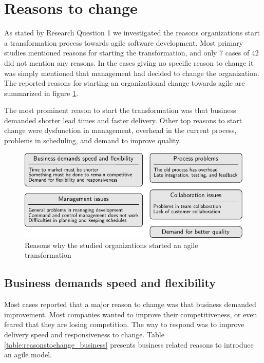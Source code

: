 \clearpage

\section{Reasons to change}

As stated by Research Question 1 we investigated the reasons organizations start
a transformation process towards agile software development. Most primary
studies mentioned reasons for starting the transformation, and only 7 cases of
42 did not mention any reasons. In the cases giving no specific reason to change
it was simply mentioned that management had decided to change the organization.
The reported reasons for starting an organizational change towards agile are
summarized in figure \ref{fig:reasonstochange_summary}.



The most prominent reason to start the transformation was that business demanded
shorter lead times and faster delivery. Other top reasons to start change were
dysfunction in management, overhead in the current process, problems in
scheduling, and demand to improve quality.


\begin{figure}[h]
  \begin{center}
    \includegraphics{graphics/reasonstochange_summary.pdf}
    \caption{Reasons why the studied organizations started an agile
             transformation}
    \label{fig:reasonstochange_summary}
  \end{center}
\end{figure}

\subsection{Business demands speed and flexibility}

Most cases reported that a major reason to change was that business demanded
improvement. Most companies wanted to improve their competitiveness, or even
feared that they are losing competition. The way to respond was to improve
delivery speed and responsiveness to change. Table
\ref{table:reasonstochange_business} presents business related reasons to
introduce an agile model.

